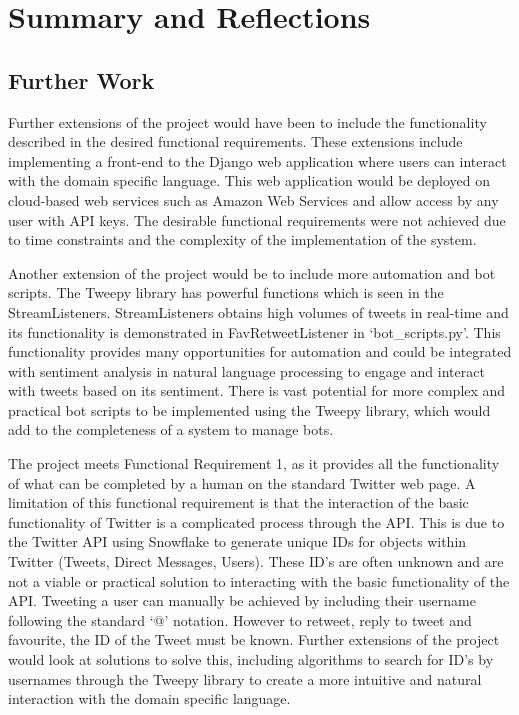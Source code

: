 \chapter{Summary and Reflections}

\section{Further Work}

Further extensions of the project would have been to include the functionality described in the desired functional requirements. These extensions include implementing a front-end to the Django web application where users can interact with the domain specific language. This web application would be deployed on cloud-based web services such as Amazon Web Services and allow access by any user with API keys. The desirable functional requirements were not achieved due to time constraints and the complexity of the implementation of the system. \newline \par

Another extension of the project would be to include more automation and bot scripts. The Tweepy library has powerful functions which is seen in the StreamListeners. StreamListeners obtains high volumes of tweets in real-time and its functionality is demonstrated in FavRetweetListener in `bot\_scripts.py'. This functionality provides many opportunities for automation and could be integrated with sentiment analysis in natural language processing to engage and interact with tweets based on its sentiment. There is vast potential for more complex and practical bot scripts to be implemented using the Tweepy library, which would add to the completeness of a system to manage bots. \newline \par
 
The project meets Functional Requirement 1, as it provides all the functionality of what can be completed by a human on the standard Twitter web page. A limitation of this functional requirement is that the interaction of the basic functionality of Twitter is a complicated process through the API. This is due to the Twitter API using Snowflake to generate unique IDs for objects within Twitter (Tweets, Direct Messages, Users). These ID's are often unknown and are not a viable or practical solution to interacting with the basic functionality of the API. Tweeting a user can manually be achieved by including their username following the standard `@' notation. However to retweet, reply to tweet and favourite, the ID of the Tweet must be known. Further extensions of the project would look at solutions to solve this, including algorithms to search for ID's by usernames through the Tweepy library to create a more intuitive and natural interaction with the domain specific language.

